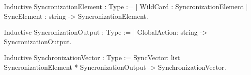 Inductive SyncronizationElement : Type :=
  | WildCard    : SyncronizationElement
  | SyncElement : string -> SyncronizationElement.

Inductive SyncronizationOutput : Type :=
  | GlobalAction: string -> SyncronizationOutput.

Inductive SynchronizationVector : Type := 
  SyncVector: list SyncronizationElement * SyncronizationOutput -> 
              SynchronizationVector.
